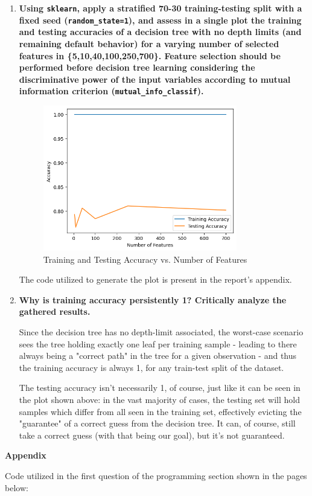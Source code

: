\documentclass[12pt]{article}
\begin{document}
\begin{enumerate}[leftmargin=\labelsep,resume]
\item \textbf{Using \texttt{sklearn}, apply a stratified 70-30 training-testing split with a fixed seed (\texttt{random\_state=1}), and assess in a single plot the training and testing accuracies of a decision tree with no depth limits (and remaining default behavior) for a varying number of selected features in \{5,10,40,100,250,700\}. Feature selection should be performed before decision tree learning considering the discriminative power of the input variables according to mutual information criterion (\texttt{mutual\_info\_classif}).}

\begin{figure}[htpb]
  \centering
  \includegraphics[width=0.8\textwidth]{../assets/hw1-2.1.png}
  \caption{Training and Testing Accuracy vs. Number of Features}
\end{figure}

The code utilized to generate the plot is present in the report's appendix.

\item \textbf{Why is training accuracy persistently 1? Critically analyze the gathered results.}

Since the decision tree has no depth-limit associated, the worst-case scenario sees the tree
holding exactly one leaf per training sample - leading to there always being a "correct path" in the tree for a given observation - and thus the training accuracy is always 1, for any train-test split of the dataset.

The testing accuracy isn't necessarily 1, of course, just like it can be seen in the plot shown above: in the vast majority of cases, the testing set will hold samples which differ from all seen in the training set, effectively evicting the "guarantee" of a correct guess from the decision tree. It can, of course, still take a correct guess (with that being our goal), but it's not guaranteed.

\end{enumerate}

\large{\textbf{Appendix}\vskip 0.3cm}

Code utilized in the first question of the programming section shown in the pages below:


\end{document}
